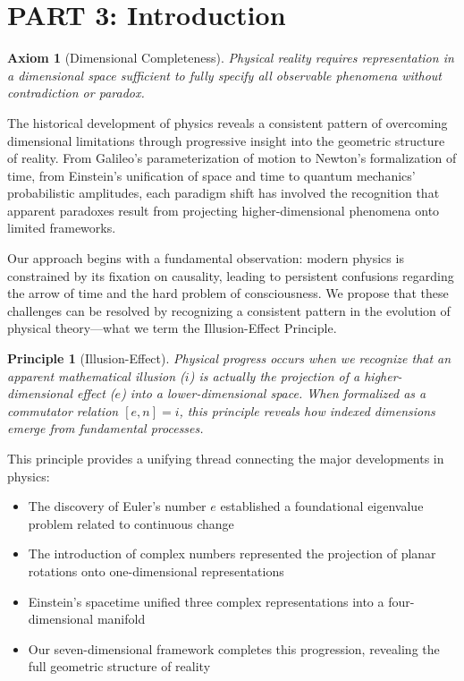 \documentclass{article}
\newtheorem{axiom}{Axiom}
\newtheorem{principle}{Principle}
\begin{document}
\section{PART 3: Introduction}

\begin{axiom}[Dimensional Completeness]
Physical reality requires representation in a dimensional space sufficient to fully specify all observable phenomena without contradiction or paradox.
\end{axiom}

The historical development of physics reveals a consistent pattern of overcoming dimensional limitations through progressive insight into the geometric structure of reality. From Galileo's parameterization of motion to Newton's formalization of time, from Einstein's unification of space and time to quantum mechanics' probabilistic amplitudes, each paradigm shift has involved the recognition that apparent paradoxes result from projecting higher-dimensional phenomena onto limited frameworks.

Our approach begins with a fundamental observation: modern physics is constrained by its fixation on causality, leading to persistent confusions regarding the arrow of time and the hard problem of consciousness. We propose that these challenges can be resolved by recognizing a consistent pattern in the evolution of physical theory—what we term the Illusion-Effect Principle.

\begin{principle}[Illusion-Effect]
Physical progress occurs when we recognize that an apparent mathematical illusion ($i$) is actually the projection of a higher-dimensional effect ($e$) into a lower-dimensional space. When formalized as a commutator relation $[e, n] = i$, this principle reveals how indexed dimensions emerge from fundamental processes.
\end{principle}

This principle provides a unifying thread connecting the major developments in physics:

\begin{itemize}
\item The discovery of Euler's number $e$ established a foundational eigenvalue problem related to continuous change
\item The introduction of complex numbers represented the projection of planar rotations onto one-dimensional representations
\item Einstein's spacetime unified three complex representations into a four-dimensional manifold
\item Our seven-dimensional framework completes this progression, revealing the full geometric structure of reality
\end{itemize}
\end{document}
